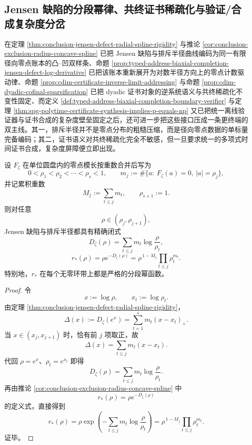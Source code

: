 \subsection{Jensen 缺陷的分段幂律、共终证书稀疏化与验证/合成复杂度分岔}\label{subsec:conclusion-jensen-repulsion-cofinal-certificate-complexity-bifurcation}

在定理 \ref{thm:conclusion-jensen-defect-radial-spline-rigidity} 与推论 \ref{cor:conclusion-exclusion-radius-concave-spline} 已把 Jensen 缺陷与排斥半径曲线编码为同一有限径向零点账本的凸--凹双样条、命题 \ref{prop:typed-address-biaxial-completion-jensen-defect-log-derivative} 已把该账本重新展开为对数半径方向上的零点计数驱动律、命题 \ref{prop:cdim-certificate-inverse-limit-addressing} 与命题 \ref{prop:cdim-dyadic-cofinal-sparsification} 已把 dyadic 证书对象的逆系统语义与共终稀疏化不变性固定、而定义 \ref{def:typed-address-biaxial-completion-boundary-verifier} 与定理 \ref{thm:spg-polytime-certificate-synthesis-implies-p-equals-np} 又已把统一离线验证器与证书合成的复杂度壁垒固定之后，还可进一步把这些接口压成一条更终端的双主线。其一，排斥半径并不是零点分布的粗糙压缩，而是径向零点数据的单标量完备编码；其二，证书语义对共终稀疏化完全不敏感，但一旦要求统一的多项式时间证书合成，复杂度屏障便立即出现。

\begin{theorem}[排斥半径函数的分段幂律刚性]\label{thm:conclusion-jensen-repulsion-piecewise-power-law}
设 \(F_\zeta\) 在单位圆盘内的零点模长按重数合并后写为
\[
0<\rho_1<\rho_2<\cdots<\rho_s<1,
\qquad
m_j:=\#\{a:\ F_\zeta(a)=0,\ |a|=\rho_j\},
\]
并记累积重数
\[
M_j:=\sum_{t\le j}m_t,
\qquad
\rho_{s+1}:=1.
\]
则对任意
\[
\rho\in(\rho_j,\rho_{j+1}),
\]
Jensen 缺陷与排斥半径都具有精确闭式
\[
D_\zeta(\rho)=\sum_{t\le j}m_t\log\frac{\rho}{\rho_t},
\]
\[
r_\ast(\rho)=\rho e^{-D_\zeta(\rho)}
=
\rho^{\,1-M_j}\prod_{t\le j}\rho_t^{m_t}.
\]
特别地，\(r_\ast\) 在每个无零环带上都是严格的分段幂函数。
\end{theorem}

\begin{proof}
令
\[
x:=\log \rho,
\qquad
x_t:=\log \rho_t.
\]
由定理 \ref{thm:conclusion-jensen-defect-radial-spline-rigidity}，
\[
\Delta(x):=D_\zeta(e^x)=\sum_{t=1}^{s}m_t(x-x_t)_+.
\]
当 \(x\in(x_j,x_{j+1})\) 时，恰有前 \(j\) 项取正，故
\[
\Delta(x)=\sum_{t\le j}m_t(x-x_t).
\]
代回 \(\rho=e^x\)、\(\rho_t=e^{x_t}\) 即得
\[
D_\zeta(\rho)=\sum_{t\le j}m_t\log\frac{\rho}{\rho_t}.
\]
再由推论 \ref{cor:conclusion-exclusion-radius-concave-spline} 中
\[
r_\ast(\rho)=\rho e^{-D_\zeta(\rho)}
\]
的定义式，直接得到
\[
r_\ast(\rho)
=
\rho
\exp\!\left(-\sum_{t\le j}m_t\log\frac{\rho}{\rho_t}\right)
=
\rho^{\,1-M_j}\prod_{t\le j}\rho_t^{m_t}.
\]
证毕。
\end{proof}


